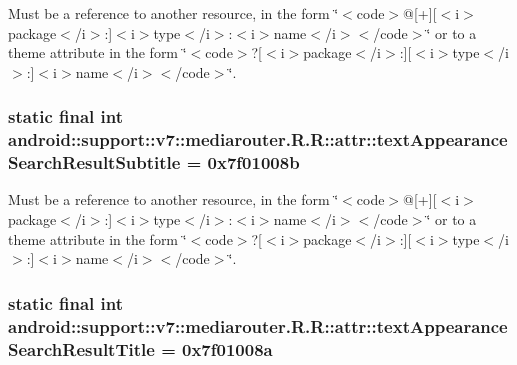 Must be a reference to another resource, in the form \char`\"{}$<$code$>$@\mbox{[}+\mbox{]}\mbox{[}$<$i$>$package$<$/i$>$:\mbox{]}$<$i$>$type$<$/i$>$:$<$i$>$name$<$/i$>$$<$/code$>$\char`\"{} or to a theme attribute in the form \char`\"{}$<$code$>$?\mbox{[}$<$i$>$package$<$/i$>$:\mbox{]}\mbox{[}$<$i$>$type$<$/i$>$:\mbox{]}$<$i$>$name$<$/i$>$$<$/code$>$\char`\"{}. \hypertarget{classandroid_1_1support_1_1v7_1_1mediarouter_1_1_r_1_1attr_0f4c88043a5be589cbb589ca45be3cd8}{
\subsubsection[{textAppearanceSearchResultSubtitle}]{\setlength{\rightskip}{0pt plus 5cm}static final int android::support::v7::mediarouter.R.R::attr::textAppearanceSearchResultSubtitle = 0x7f01008b}}
\label{classandroid_1_1support_1_1v7_1_1mediarouter_1_1_r_1_1attr_0f4c88043a5be589cbb589ca45be3cd8}


Must be a reference to another resource, in the form \char`\"{}$<$code$>$@\mbox{[}+\mbox{]}\mbox{[}$<$i$>$package$<$/i$>$:\mbox{]}$<$i$>$type$<$/i$>$:$<$i$>$name$<$/i$>$$<$/code$>$\char`\"{} or to a theme attribute in the form \char`\"{}$<$code$>$?\mbox{[}$<$i$>$package$<$/i$>$:\mbox{]}\mbox{[}$<$i$>$type$<$/i$>$:\mbox{]}$<$i$>$name$<$/i$>$$<$/code$>$\char`\"{}. \hypertarget{classandroid_1_1support_1_1v7_1_1mediarouter_1_1_r_1_1attr_6c532802f42d6b4a4b5ccd151777849a}{
\subsubsection[{textAppearanceSearchResultTitle}]{\setlength{\rightskip}{0pt plus 5cm}static final int android::support::v7::mediarouter.R.R::attr::textAppearanceSearchResultTitle = 0x7f01008a}}
\label{classandroid_1_1support_1_1v7_1_1mediarouter_1_1_r_1_1attr_6c532802f42d6b4a4b5ccd151777849a}


